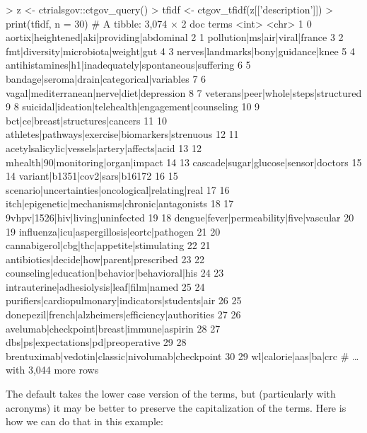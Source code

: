 \begin{example}
> z <- ctrialsgov::ctgov_query()
> tfidf <- ctgov_tfidf(z[['description']])
> print(tfidf, n = 30)
# A tibble: 3,074 × 2
     doc terms
   <int> <chr>
 1     0 aortix|heightened|aki|providing|abdominal
 2     1 pollution|ms|air|viral|france
 3     2 fmt|diversity|microbiota|weight|gut
 4     3 nerves|landmarks|bony|guidance|knee
 5     4 antihistamines|h1|inadequately|spontaneous|suffering
 6     5 bandage|seroma|drain|categorical|variables
 7     6 vagal|mediterranean|nerve|diet|depression
 8     7 veterans|peer|whole|steps|structured
 9     8 suicidal|ideation|telehealth|engagement|counseling
10     9 bct|ce|breast|structures|cancers
11    10 athletes|pathways|exercise|biomarkers|strenuous
12    11 acetylsalicylic|vessels|artery|affects|acid
13    12 mhealth|90|monitoring|organ|impact
14    13 cascade|sugar|glucose|sensor|doctors
15    14 variant|b1351|cov2|sars|b16172
16    15 scenario|uncertainties|oncological|relating|real
17    16 itch|epigenetic|mechanisms|chronic|antagonists
18    17 9vhpv|1526|hiv|living|uninfected
19    18 dengue|fever|permeability|five|vascular
20    19 influenza|icu|aspergillosis|eortc|pathogen
21    20 cannabigerol|cbg|thc|appetite|stimulating
22    21 antibiotics|decide|how|parent|prescribed
23    22 counseling|education|behavior|behavioral|his
24    23 intrauterine|adhesiolysis|leaf|film|named
25    24 purifiers|cardiopulmonary|indicators|students|air
26    25 donepezil|french|alzheimers|efficiency|authorities
27    26 avelumab|checkpoint|breast|immune|aspirin
28    27 dbs|ps|expectations|pd|preoperative
29    28 brentuximab|vedotin|classic|nivolumab|checkpoint
30    29 wl|calorie|aas|ba|crc
# … with 3,044 more rows
\end{example}

The default takes the lower case version of the terms, but (particularly with
acronyms) it may be better to preserve the capitalization of the terms. Here is
how we can do that in this example:

